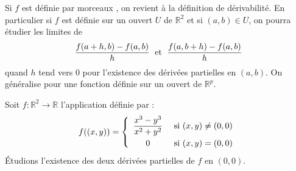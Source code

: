 \documentclass[french,11pt,twoside]{VcCours}
\begin{document}
\begin{Remarque}{} Si $f$ est définie \og par morceaux \fg, on revient à la définition de dérivabilité. En particulier si $f$ est définie sur un ouvert $U$ de $\mathbb{R}^2$ et si $(a,b) \in U$, on pourra étudier les limites de 
$$ \dfrac{f(a+h,b)-f(a,b)}{h} \; \hbox{ et } \; \dfrac{f(a,b+h)-f(a,b)}{h}$$
quand $h$ tend vers $0$ pour l'existence des dérivées partielles en $(a,b)$. On généralise pour une fonction définie sur un ouvert de $\mathbb{R}^p$.
\end{Remarque}

\medskip

\begin{Exemple}{} Soit $f : \mathbb{R}^2 \rightarrow \mathbb{R}$ l'application définie par :
$$ f((x,y)) = \left\lbrace \begin{array}{ccl}
\dfrac{x^3-y^3}{x^2+y^2} & \hbox{ si } (x,y) \neq (0,0) \\[0.3cm]
0 & \hbox{ si } (x,y)=(0,0) \\
\end{array}\right.$$
Étudions l'existence des deux dérivées partielles de $f$ en $(0,0)$.

%

\vspace{8cm}
\end{Exemple}

\newpage

$\phantom{test}$

\vspace{4cm}
\end{document}
